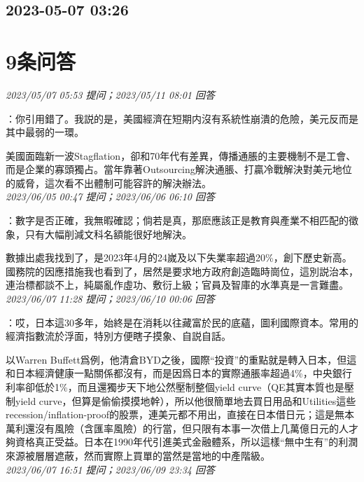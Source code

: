 \documentclass[twocolumn]{ctexart}
\begin{document}
\subsection{2023-05-07 03:26}


\section{9条问答}

\textit{\hfill\noindent\small 2023/05/07 05:53 提问；2023/05/11 08:01 回答}

：你引用錯了。我説的是，美國經濟在短期内沒有系統性崩潰的危險，美元反而是其中最弱的一環。

美國面臨新一波Stagflation，卻和70年代有差異，傳播通脹的主要機制不是工會、而是企業的寡頭獨占。當年靠著Outsourcing解決通脹、打贏冷戰解決對美元地位的威脅，這次看不出體制可能容許的解決辦法。
\\

\textit{\hfill\noindent\small 2023/06/05 00:47 提问；2023/06/06 06:10 回答}

：數字是否正確，我無暇確認；倘若是真，那麽應該正是教育與產業不相匹配的徵象，只有大幅削減文科名額能很好地解決。


數據出處我找到了，是2023年4月的24嵗及以下失業率超過20\%，創下歷史新高。國務院的因應措施我也看到了，居然是要求地方政府創造臨時崗位，這別説治本，連治標都談不上，純屬亂作虛功、敷衍上級；官員及智庫的水準真是一言難盡。
\\

\textit{\hfill\noindent\small 2023/06/07 11:28 提问；2023/06/10 00:06 回答}

：哎，日本這30多年，始終是在消耗以往藏富於民的底蘊，圖利國際資本。常用的經濟指數流於浮面，特別方便瞎子摸象、自説自話。

以Warren Buffett爲例，他清倉BYD之後，國際“投資”的重點就是轉入日本，但這和日本經濟健康一點關係都沒有，而是因爲日本的實際通脹率超過4\%，中央銀行利率卻低於1\%，而且還獨步天下地公然壓制整個yield curve（QE其實本質也是壓制yield curve，但算是偷偷摸摸地幹），所以他很簡單地去買日用品和Utilities這些recession/inflation-proof的股票，連美元都不用出，直接在日本借日元；這是無本萬利還沒有風險（含匯率風險）的行當，但只限有本事一次借上几萬億日元的人才夠資格真正受益。日本在1990年代引進美式金融體系，所以這樣“無中生有”的利潤來源被層層遮蔽，然而實際上買單的當然是當地的中產階級。
\\

\textit{\hfill\noindent\small 2023/06/07 16:51 提问；2023/06/09 23:34 回答}
\end{document}
